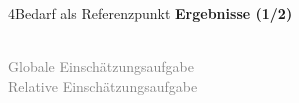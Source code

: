 \documentclass[xcolor=table,9pt,aspectratio=169]{beamer}
\begin{document}
\begin{frame}{\vspace*{10mm}4\hspace*{1em}Bedarf als Referenzpunkt}
\textbf{Ergebnisse (1/2)}\\
\medskip
\begin{multicols}{2}
   \begin{center}
      \\
      \footnotesize{\textcolor{gray}{Globale Einschätzungsaufgabe}}
      \\
      \footnotesize{\textcolor{gray}{Relative Einschätzungsaufgabe}}
   \end{center}

\end{multicols}
\end{frame}
\end{document}
